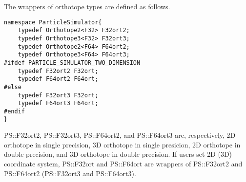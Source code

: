 The wrappers of orthotope types are defined as follows.

\begin{lstlisting}[caption=Orthotope wrapper]
namespace ParticleSimulator{
    typedef Orthotope2<F32> F32ort2;
    typedef Orthotope3<F32> F32ort3;
    typedef Orthotope2<F64> F64ort2;
    typedef Orthotope3<F64> F64ort3;
#ifdef PARTICLE_SIMULATOR_TWO_DIMENSION
    typedef F32ort2 F32ort;
    typedef F64ort2 F64ort;
#else
    typedef F32ort3 F32ort;
    typedef F64ort3 F64ort;
#endif
}
\end{lstlisting}

PS::F32ort2, PS::F32ort3, PS::F64ort2, and PS::F64ort3 are,
respectively, 2D orthotope in single precision, 3D orthotope in single
presicion, 2D orthotope in double precision, and 3D orthotope in double
precision. If users set 2D (3D) coordinate system, PS::F32ort and
PS::F64ort are wrappers of PS::F32ort2 and PS::F64ort2 (PS::F32ort3 and
PS::F64ort3).

